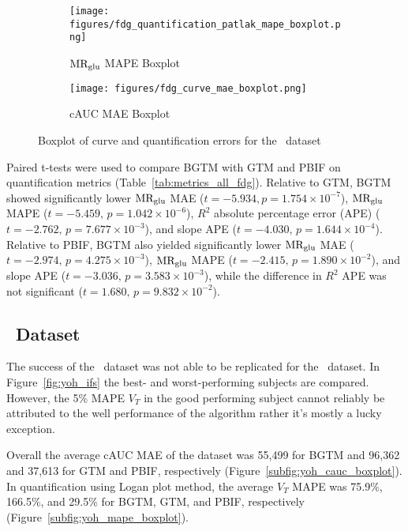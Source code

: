 \begin{figure}
	\centering
	\begin{subfigure}[b]{0.45\textwidth}
		\texttt{[image: figures/fdg\_quantification\_patlak\_mape\_boxplot.png]}
		\caption{\(\text{MR}_{\text{glu}}\) MAPE Boxplot}
		\label{subfig:fdg_mape_boxplot}
	\end{subfigure}
	\begin{subfigure}[b]{0.45\textwidth}
		\texttt{[image: figures/fdg\_curve\_mae\_boxplot.png]}
		\caption{cAUC MAE Boxplot}
		\label{subfig:fdg_cauc_boxplot}
	\end{subfigure}
	\caption{Boxplot of curve and quantification errors for the \fdg\ dataset}
	\label{fig:fdg_boxplots}
\end{figure}




Paired t-tests were used to compare BGTM with GTM and PBIF on quantification metrics (Table~\ref{tab:metrics_all_fdg}).
Relative to GTM, BGTM showed significantly lower \(\text{MR}_{\text{glu}}\) MAE (\(t=-5.934, p=1.754\times 10^{-7}\)), \(\text{MR}_{\text{glu}}\) MAPE (\(t=-5.459,\,p=1.042\times 10^{-6}\)), \(R^2\) absolute percentage error (APE) (\(t=-2.762,\,p=7.677\times 10^{-3}\)), and slope APE (\(t=-4.030,\,p=1.644\times 10^{-4}\)).
Relative to PBIF, BGTM also yielded significantly lower \(\text{MR}_{\text{glu}}\) MAE (\(t=-2.974,\,p=4.275\times 10^{-3}\)), \(\text{MR}_{\text{glu}}\) MAPE (\(t=-2.415,\,p=1.890\times 10^{-2}\)), and slope APE (\(t=-3.036,\,p=3.583\times 10^{-3}\)), while the difference in \(R^2\) APE was not significant (\(t=1.680,\,p=9.832\times 10^{-2}\)).


\subsection{\yohimbine\ Dataset}

The success of the \fdg\ dataset was not able to be replicated for the \yohimbine\ dataset.
In Figure~\ref{fig:yoh_ifs} the best- and worst-performing subjects are compared.
However, the 5\% MAPE $V_T$ in the good performing subject cannot reliably be attributed to the well performance of the algorithm rather it's mostly a lucky exception.

Overall the average cAUC MAE of the dataset was 55{,}499 for BGTM and 96{,}362 and 37{,}613 for GTM and PBIF, respectively (Figure~\ref{subfig:yoh_cauc_boxplot}).
In quantification using Logan plot method, the average \(V_T\) MAPE was 75.9\%, 166.5\%, and 29.5\% for BGTM, GTM, and PBIF, respectively (Figure~\ref{subfig:yoh_mape_boxplot}).

